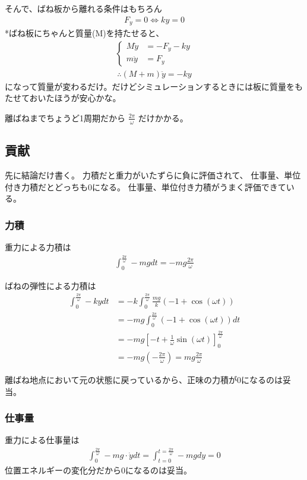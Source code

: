 \documentclass[a4paper,11pt]{jsarticle}
\begin{document}
そんで、ばね板から離れる条件はもちろん
\begin{align}
  F_y = 0 \Leftrightarrow ky = 0
\end{align}
*ばね板にちゃんと質量(M)を持たせると、
\begin{align}
  \begin{cases}
    M\ddot{y} & = -F_y - ky
    \\ m\ddot{y} &= F_y
  \end{cases}
\end{align}
\begin{align}
  \therefore (M + m)\ddot{y} = - ky
\end{align}
になって質量が変わるだけ。だけどシミュレーションするときには板に質量をもたせておいたほうが安心かな。

離ばねまでちょうど1周期だから
$\frac{2\pi}{\omega}$
だけかかる。

\subsection{貢献}
先に結論だけ書く。
力積だと重力がいたずらに負に評価されて、
仕事量、単位付き力積だとどっちも0になる。
仕事量、単位付き力積がうまく評価できている。

\subsubsection{力積}
重力による力積は
\begin{align}
  \int_0^{\frac{2\pi}{\omega}} -mg dt = -mg \frac{2\pi}{\omega}
\end{align}

ばねの弾性による力積は
\begin{align}
  \int_0^{\frac{2\pi}{\omega}} -ky dt & = -k \int_0^{\frac{2\pi}{\omega}} \frac{mg}{k}\left(-1+\cos(\omega t)\right)
  \\ &= -mg \int_0^{\frac{2\pi}{\omega}} \left(-1+\cos(\omega t)\right) dt
  \\ &= -mg \left[-t+\frac{1}{\omega}\sin(\omega t)\right]_0^{\frac{2\pi}{\omega}}
  \\ &= -mg \left( -\frac{2\pi}{\omega} \right) = mg \frac{2\pi}{\omega}
\end{align}

離ばね地点において元の状態に戻っているから、正味の力積が0になるのは妥当。

\subsubsection{仕事量}
重力による仕事量は
\begin{align}
  \int_0^{\frac{2\pi}{\omega}} -mg\cdot\dot{y} dt = \int_{t=0}^{t=\frac{2\pi}{\omega}} -mg dy = 0
\end{align}
位置エネルギーの変化分だから0になるのは妥当。
\end{document}
